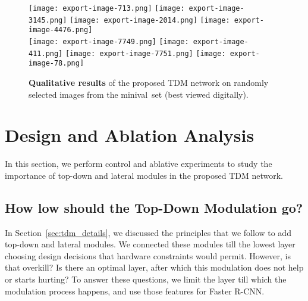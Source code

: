\documentclass[10pt,twocolumn,letterpaper]{article}
\makeatletter
\newcommand{\minival}{minival\raisebox{0.2ex}{}}
\def\maxwidth#1{\ifdim\Gin@nat@width>#1 #1\else\Gin@nat@width\fi}
\makeatother
\begin{document}
\begin{figure*}
\texttt{[image: export-image-713.png]}\hspace{0.1in}
\texttt{[image: export-image-3145.png]}\hspace{0.1in}
\texttt{[image: export-image-2014.png]}\hspace{0.1in}\vspace{0.1in}
\texttt{[image: export-image-4476.png]}\\
\texttt{[image: export-image-7749.png]}\hspace{0.1in}
\texttt{[image: export-image-411.png]}\hspace{0.1in}
\texttt{[image: export-image-7751.png]}\hspace{0.1in}\vspace{0.1in}
\texttt{[image: export-image-78.png]}
\caption[{\small Qualitative results of the TDM network.}]{\textbf{Qualitative results} of the proposed TDM network on randomly selected images from the \minival\ set (best viewed digitally).}
\label{fig:tdm_qual}
\vspace{-0.1in}
\end{figure*}




\section{Design and Ablation Analysis}\label{sec:analysis}
In this section, we perform control and ablative experiments to study the importance of top-down and lateral modules in the proposed TDM network.

\subsection{How low should the Top-Down Modulation go?}\label{sec:howlow}
In Section~\ref{sec:tdm_details}, we discussed the principles that we follow to add top-down and lateral modules. We connected these modules till the lowest layer choosing design decisions that hardware constraints would permit. However, is that overkill? Is there an optimal layer, after which this modulation does not help or starts hurting? To answer these questions, we limit the layer till which the modulation process happens, and use those features for Faster R-CNN.
\end{document}
